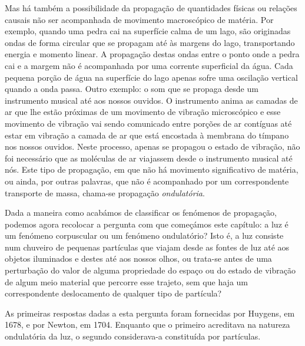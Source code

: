 Mas há também a possibilidade da propagação de quantidades físicas ou relações
causais não ser acompanhada de movimento macroscópico de matéria. Por exemplo,
quando uma pedra cai na superfície calma de um lago, são originadas ondas de
forma circular que se propagam até às margens do lago, transportando 
energia e momento linear. A propagação destas ondas entre o ponto onde
a pedra cai e a margem não é acompanhada por uma corrente superficial da água.
Cada pequena porção de água na superfície do lago apenas sofre uma oscilação
vertical quando a onda passa. Outro exemplo: o som que se propaga desde um
instrumento musical até aos nossos ouvidos. O instrumento anima as camadas de
ar que lhe estão próximas de um movimento de vibração microscópico e esse
movimento de vibração vai sendo comunicado entre porções de ar contíguas até
estar em vibração a camada de ar que está encostada à membrana do tímpano nos
nossos ouvidos. Neste processo, apenas se propagou o estado de vibração, não
foi necessário que as moléculas de ar viajassem desde o instrumento musical até
nós. Este tipo de propagação, em que não há movimento significativo de matéria,
ou ainda, por outras palavras, que não é acompanhado por um correspondente
transporte de massa, chama-se propagação \emph{ondulatória}.

Dada a maneira como acabámos de classificar os fenómenos de propagação, podemos
agora recolocar a pergunta com que começámos este capítulo: a luz é um
fenómeno corpuscular ou um fenómeno ondulatório? Isto é, a luz consiste num
chuveiro de pequenas partículas que viajam desde as fontes de luz até aos
objetos iluminados e destes até aos nossos olhos, ou trata-se antes de uma
perturbação do valor de alguma propriedade do espaço ou do estado de vibração de
algum meio material que percorre esse trajeto, sem que haja um correspondente
deslocamento de qualquer tipo de partícula?

As primeiras respostas dadas a esta pergunta foram fornecidas por Huygens, em
1678, e por Newton, em 1704. Enquanto que o primeiro acreditava na natureza
ondulatória da luz, o segundo considerava-a constituída por partículas.

